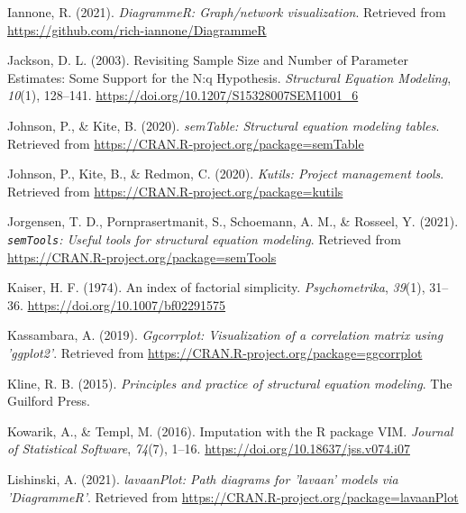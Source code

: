 \documentclass[
  english,
  man]{apa6}
\newlength{\cslhangindent}
\newlength{\cslentryspacingunit} %
\newenvironment{CSLReferences}[2] %
 {%
  \setlength{\parindent}{0pt}
  \ifodd #1
  \let\oldpar\par
  \def\par{\hangindent=\cslhangindent\oldpar}
  \fi
  \setlength{\parskip}{#2\cslentryspacingunit}
 }%
 {}
\begin{document}
\begin{CSLReferences}{1}{0}
\leavevmode{}%
Iannone, R. (2021). \emph{DiagrammeR: Graph/network visualization}. Retrieved from \url{https://github.com/rich-iannone/DiagrammeR}

\leavevmode{}%
Jackson, D. L. (2003). Revisiting {Sample Size} and {Number} of {Parameter Estimates}: {Some Support} for the {N}:q {Hypothesis}. \emph{Structural Equation Modeling}, \emph{10}(1), 128--141. \url{https://doi.org/10.1207/S15328007SEM1001_6}

\leavevmode{}%
Johnson, P., \& Kite, B. (2020). \emph{semTable: Structural equation modeling tables}. Retrieved from \url{https://CRAN.R-project.org/package=semTable}

\leavevmode{}%
Johnson, P., Kite, B., \& Redmon, C. (2020). \emph{Kutils: Project management tools}. Retrieved from \url{https://CRAN.R-project.org/package=kutils}

\leavevmode{}%
Jorgensen, T. D., Pornprasertmanit, S., Schoemann, A. M., \& Rosseel, Y. (2021). \emph{\texttt{semTools}: {U}seful tools for structural equation modeling}. Retrieved from \url{https://CRAN.R-project.org/package=semTools}

\leavevmode{}%
Kaiser, H. F. (1974). An index of factorial simplicity. \emph{Psychometrika}, \emph{39}(1), 31--36. \url{https://doi.org/10.1007/bf02291575}

\leavevmode{}%
Kassambara, A. (2019). \emph{Ggcorrplot: Visualization of a correlation matrix using 'ggplot2'}. Retrieved from \url{https://CRAN.R-project.org/package=ggcorrplot}

\leavevmode{}%
Kline, R. B. (2015). \emph{Principles and practice of structural equation modeling}. {The Guilford Press}.

\leavevmode{}%
Kowarik, A., \& Templ, M. (2016). Imputation with the {R} package {VIM}. \emph{Journal of Statistical Software}, \emph{74}(7), 1--16. \url{https://doi.org/10.18637/jss.v074.i07}

\leavevmode{}%
Lishinski, A. (2021). \emph{lavaanPlot: Path diagrams for 'lavaan' models via 'DiagrammeR'}. Retrieved from \url{https://CRAN.R-project.org/package=lavaanPlot}


\end{CSLReferences}
\end{document}
